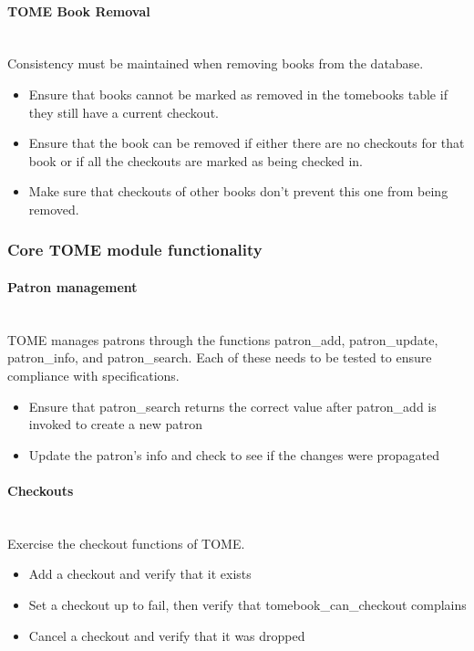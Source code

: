 \documentclass[12pt,titlepage]{article}
\begin{document}
\paragraph{TOME Book Removal}
\hspace{1pt}\\ Consistency must be maintained when removing books from the database.
\begin{itemize}
	\item Ensure that books cannot be marked as removed in the tomebooks table if they still have a current checkout.
	\item Ensure that the book can be removed if either there are no checkouts for that book or if all the checkouts are marked as being checked in.
	\item Make sure that checkouts of other books don't prevent this one from being removed.
\end{itemize}

\subsubsection{Core TOME module functionality}
\paragraph{Patron management}
\hspace{1pt}\\ TOME manages patrons through the functions patron\_add, patron\_update, patron\_info, and patron\_search.  Each of these needs to be tested to ensure compliance with specifications.
\begin{itemize}
	\item Ensure that patron\_search returns the correct value after patron\_add is invoked to create a new patron
	\item Update the patron's info and check to see if the changes were propagated
\end{itemize}

\paragraph{Checkouts}
\hspace{1pt}\\ Exercise the checkout functions of TOME.
\begin{itemize}
	\item Add a checkout and verify that it exists
	\item Set a checkout up to fail, then verify that tomebook\_can\_checkout complains
	\item	Cancel a checkout and verify that it was dropped
\end{itemize}
\end{document}
